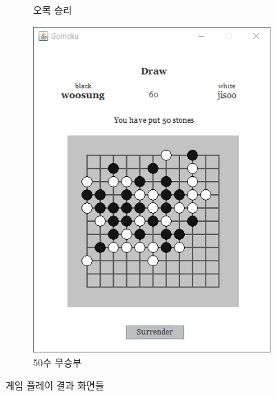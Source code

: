 \documentclass[a4paper, 10pt]{article}
\begin{document}
\begin{figure}[h]
\begin{subfigure}{.3\textwidth}
    \caption{오목 승리}
    \label{fig:win}
  \end{subfigure}
  \begin{subfigure}{.3\textwidth}
    \centering
    \includegraphics[width=.8\linewidth]{resource/draw}
    \caption{50수 무승부}
    \label{fig:draw}
  \end{subfigure}
  \caption{게임 플레이 결과 화면들}
\end{figure}
\end{document}
